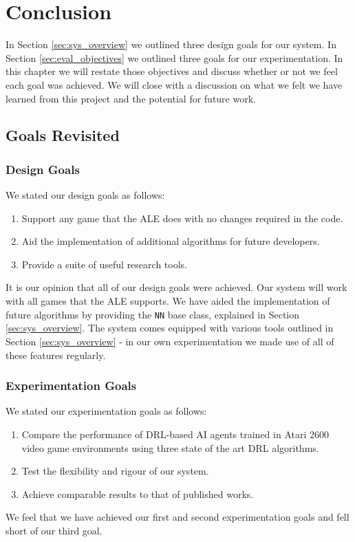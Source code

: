 \chapter{Conclusion}
In Section \ref{sec:sys_overview} we outlined three design goals for our system. In Section \ref{sec:eval_objectives} we outlined three goals for our experimentation. In this chapter we will restate those objectives and discuss whether or not we feel each goal was achieved. We will close with a discussion on what we felt we have learned from this project and the potential for future work.
\section{Goals Revisited}
\subsection{Design Goals}
We stated our design goals as follows:
\begin{enumerate}
	\item Support any game that the ALE does with no changes required in the code.
	\item Aid the implementation of additional algorithms for future developers.
	\item Provide a suite of useful research tools.
\end{enumerate}
It is our opinion that all of our design goals were achieved. Our system will work with all games that the ALE supports. We have aided the implementation of future algorithms by providing the \texttt{NN} base class, explained in Section \ref{sec:sys_overview}. The system comes equipped with various tools outlined in Section \ref{sec:sys_overview} - in our own experimentation we made use of all of these features regularly.

\subsection{Experimentation Goals}
We stated our experimentation goals as follows:
\begin{enumerate}
	\item Compare the performance of DRL-based AI agents trained in Atari 2600 video game environments using three state of the art DRL algorithms.
	\item Test the flexibility and rigour of our system.
	\item Achieve comparable results to that of published works.
\end{enumerate}
We feel that we have achieved our first and second experimentation goals and fell short of our third goal. \paragraph{}

